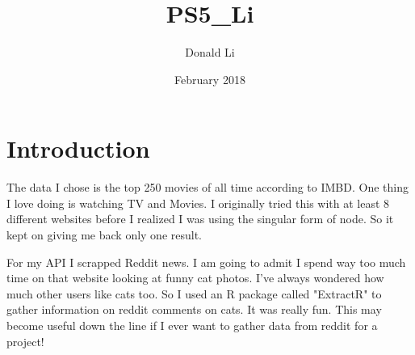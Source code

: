 \documentclass{article}
\title{PS5_Li}
\author{Donald Li}
\date{February 2018}
\begin{document}
\maketitle

\section{Introduction}
The data I chose is the top 250 movies of all time according to IMBD. One thing I love doing is watching TV and Movies. I originally tried this with at least 8 different websites before I realized I was using the singular form of node. So it kept on giving me back only one result. 

For my API I scrapped Reddit news. I am going to admit I spend way too much time on that website looking at funny cat photos. I've always wondered how much other users like cats too. So I used an R package called "ExtractR" to gather information on reddit comments on cats. It was really fun. This may become useful down the line if I ever want to gather data from reddit for a project!
\end{document}

